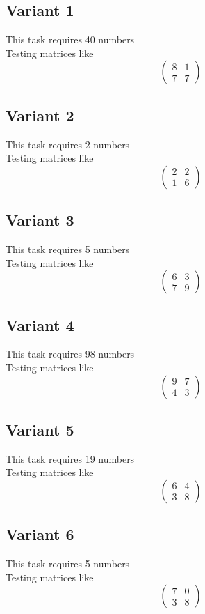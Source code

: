 \documentclass[11pt]{article}
\begin{document}
\subsection*{Variant 1}
This task requires 40 numbers\\
Testing matrices like \[ \begin{pmatrix} 8 & 1\\ 7 & 7 \end{pmatrix} \]

\subsection*{Variant 2}
This task requires 2 numbers\\
Testing matrices like \[ \begin{pmatrix} 2 & 2\\ 1 & 6 \end{pmatrix} \]

\subsection*{Variant 3}
This task requires 5 numbers\\
Testing matrices like \[ \begin{pmatrix} 6 & 3\\ 7 & 9 \end{pmatrix} \]

\subsection*{Variant 4}
This task requires 98 numbers\\
Testing matrices like \[ \begin{pmatrix} 9 & 7\\ 4 & 3 \end{pmatrix} \]

\subsection*{Variant 5}
This task requires 19 numbers\\
Testing matrices like \[ \begin{pmatrix} 6 & 4\\ 3 & 8 \end{pmatrix} \]

\subsection*{Variant 6}
This task requires 5 numbers\\
Testing matrices like \[ \begin{pmatrix} 7 & 0\\ 3 & 8 \end{pmatrix} \]
\end{document}

